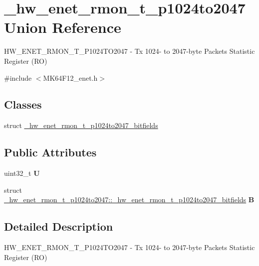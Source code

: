 \hypertarget{union__hw__enet__rmon__t__p1024to2047}{}\section{\+\_\+hw\+\_\+enet\+\_\+rmon\+\_\+t\+\_\+p1024to2047 Union Reference}
\label{union__hw__enet__rmon__t__p1024to2047}


H\+W\+\_\+\+E\+N\+E\+T\+\_\+\+R\+M\+O\+N\+\_\+\+T\+\_\+\+P1024\+T\+O2047 -\/ Tx 1024-\/ to 2047-\/byte Packets Statistic Register (RO)  




{\ttfamily \#include $<$M\+K64\+F12\+\_\+enet.\+h$>$}

\subsection*{Classes}
\begin{DoxyCompactItemize}
\item 
struct \hyperlink{struct__hw__enet__rmon__t__p1024to2047_1_1__hw__enet__rmon__t__p1024to2047__bitfields}{\+\_\+hw\+\_\+enet\+\_\+rmon\+\_\+t\+\_\+p1024to2047\+\_\+bitfields}
\end{DoxyCompactItemize}
\subsection*{Public Attributes}
\begin{DoxyCompactItemize}
\item 
uint32\+\_\+t {\bfseries U}\hypertarget{union__hw__enet__rmon__t__p1024to2047_ab7aacd0c40306147aa4db96bd4b45148}{}\label{union__hw__enet__rmon__t__p1024to2047_ab7aacd0c40306147aa4db96bd4b45148}

\item 
struct \hyperlink{struct__hw__enet__rmon__t__p1024to2047_1_1__hw__enet__rmon__t__p1024to2047__bitfields}{\+\_\+hw\+\_\+enet\+\_\+rmon\+\_\+t\+\_\+p1024to2047\+::\+\_\+hw\+\_\+enet\+\_\+rmon\+\_\+t\+\_\+p1024to2047\+\_\+bitfields} {\bfseries B}\hypertarget{union__hw__enet__rmon__t__p1024to2047_aed28abec92bbcaef6f86fa4ec93bd229}{}\label{union__hw__enet__rmon__t__p1024to2047_aed28abec92bbcaef6f86fa4ec93bd229}

\end{DoxyCompactItemize}


\subsection{Detailed Description}
H\+W\+\_\+\+E\+N\+E\+T\+\_\+\+R\+M\+O\+N\+\_\+\+T\+\_\+\+P1024\+T\+O2047 -\/ Tx 1024-\/ to 2047-\/byte Packets Statistic Register (RO) 

